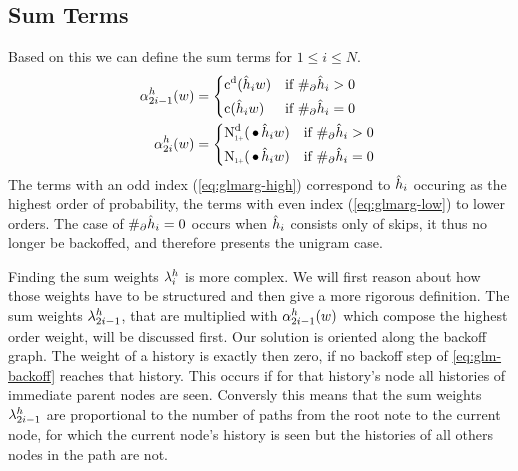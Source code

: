 \subsection{Sum Terms}

Based on this we can define the sum terms for $1 \leq i \leq N$.
\begin{subequations}
  \begin{align}
    \label{eq:glmarg-high}
    \SumArg_{2 i - 1}^h(w) &=
      \begin{dcases*}
        \DiscountedCount(\DerivedHistory[i] w)        & if $\NumSkpOp{\DerivedHistory[i]} > 0$ \\
        \Count(\DerivedHistory[i] w)                  & if $\NumSkpOp{\DerivedHistory[i]} = 0$
      \end{dcases*} \\
    \label{eq:glmarg-low}
    \SumArg_{2 i}^h(w) &=
      \begin{dcases*}
        \DiscountedCount*(\WSkp \DerivedHistory[i] w) & if $\NumSkpOp{\DerivedHistory[i]} > 0$ \\
        \ContCountIp(\WSkp \DerivedHistory[i] w)      & if $\NumSkpOp{\DerivedHistory[i]} = 0$
      \end{dcases*}
  \end{align}
\end{subequations}
The terms with an odd index (\cref{eq:glmarg-high}) correspond to
$\DerivedHistory[i]$ occuring as the highest order of probability, the terms
with even index (\cref{eq:glmarg-low}) to lower orders.
The case of $\NumSkpOp{\DerivedHistory[i]} = 0$ occurs when $\DerivedHistory[i]$
consists only of skips, it thus no longer be backoffed, and therefore
presents the unigram case.

Finding the sum weights $\lambda^h_i$ is more complex.
We will first reason about how those weights have to be structured and then
give a more rigorous definition.
The sum weights $\lambda^h_{2 i - 1}$, that are multiplied with
$\alpha^h_{2 i - 1}(w)$ which compose the highest order weight, will be
discussed first.
Our solution is oriented along the backoff graph.
The weight of a history is exactly then zero, if no backoff step of
\cref{eq:glm-backoff} reaches that history.
This occurs if for that history's node all histories of immediate parent nodes
are seen.
Conversly this means that the sum weights $\lambda^h_{2 i - 1}$ are proportional
to the number of paths from the root note to the current node, for which the
current node's history is seen but the histories of all others nodes in the
path are not.

